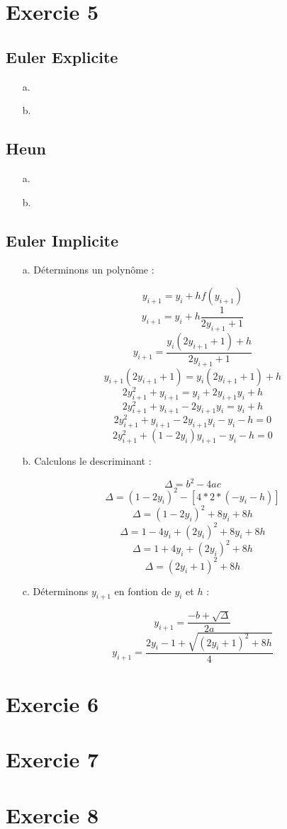\documentclass[12pt, letterpaper]{article}
\begin{document}
\section{Exercie 5}

\subsection{Euler Explicite}

\begin{enumerate}
\item[a.]

\item[b.]

\end{enumerate}

\subsection{Heun}

\begin{enumerate}
\item[a.]

\item[b.]

\end{enumerate}

\subsection{Euler Implicite}

\begin{enumerate}
\item[a.] Déterminons un polynôme :

$$ y_{i+1} = y_i + h f(y_{i+1})$$
$$ y_{i+1} = y_i + h \frac{1}{2y_{i+1} + 1}$$
$$ y_{i+1} = \frac{y_i (2y_{i+1} + 1) + h}{2y_{i+1} + 1} $$
$$ y_{i+1} (2y_{i+1} + 1) = y_i (2y_{i+1} + 1) + h $$
$$ 2y_{i+1}^2 + y_{i+1} = y_i + 2y_{i+1}y_i + h $$
$$ 2y_{i+1}^2 + y_{i+1} - 2y_{i+1}y_i = y_i + h $$
$$ 2y_{i+1}^2 + y_{i+1} - 2y_{i+1}y_i - y_i - h = 0 $$
$$ 2y_{i+1}^2 + (1 - 2y_i) y_{i+1} - y_i - h = 0 $$

\item[b.] Calculons le descriminant :

$$ \Delta = b^2 - 4ac $$
$$ \Delta = (1 - 2y_i)^2 - [4 * 2 * (- y_i - h)] $$
$$ \Delta = (1 - 2y_i)^2 + 8y_i + 8h $$
$$ \Delta = 1 - 4y_i + (2y_i)^2 + 8y_i + 8h $$
$$ \Delta = 1 + 4y_i + (2y_i)^2 + 8h $$
$$ \Delta = (2y_i + 1)^2 + 8h $$

\item[c.] Déterminons $y_{i+1}$ en fontion de $y_i$ et $h$ :

$$ y_{i+1} = \frac{- b + \sqrt{\Delta}}{2a} $$
$$ y_{i+1} = \frac{2y_i - 1 + \sqrt{(2y_i + 1)^2 + 8h}}{4} $$

\end{enumerate}

\section{Exercie 6}

\section{Exercie 7}

\section{Exercie 8}
\end{document}
